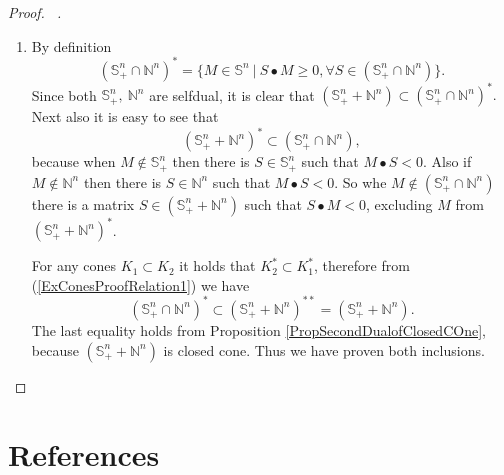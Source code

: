 \documentclass[12pt]{book}
\theoremstyle{definition}
\begin{document}
\begin{appendix}
\begin{proof}[Proof. \ ]
\begin{enumerate}
\item By definition 
$$(\mathbb{S}^n_+\cap \mathbb{N}^n)^* = \{ M\in\mathbb{S}^n \ \vert \ S\bullet M\geq 0, \forall S\in (\mathbb{S}^n_+\cap \mathbb{N}^n)\}. $$
Since both $\mathbb{S}^n_+,\ \mathbb{N}^n$ are selfdual, it is clear that $(\mathbb{S}^n_+ +\mathbb{N}^n) \subset (\mathbb{S}^n_+\cap \mathbb{N}^n)^*.$ Next also it is easy to see that 
\begin{equation}
\label{ExConesProofRelation1}
(\mathbb{S}^n_+ +\mathbb{N}^n)^* \subset (\mathbb{S}^n_+\cap \mathbb{N}^n),
\end{equation}
because 
when $M\notin \mathbb{S}^n_+$  then there is $S\in\mathbb{S}^n_+$ such that $M\bullet S < 0$. Also if $M\notin \mathbb{N}^n$ then there is $S\in\mathbb{N}^n$ such that $M\bullet S < 0$. So whe $M\notin (\mathbb{S}^n_+\cap \mathbb{N}^n)$ there is a matrix $S\in (\mathbb{S}^n_+ + \mathbb{N}^n)$ such that $S\bullet M <0$, excluding $M$ from $(\mathbb{S}^n_+ +\mathbb{N}^n)^*$.



For any cones $K_1\subset K_2$ it holds that $K_2^*\subset K_1^*$, therefore from (\ref{ExConesProofRelation1}) we have $$(\mathbb{S}^n_+ \cap \mathbb{N}^n)^* \subset (\mathbb{S}^n_+ + \mathbb{N}^n)^{**} = (\mathbb{S}^n_+ + \mathbb{N}^n).$$
The last equality holds from Proposition \ref{PropSecondDualofClosedCOne}, because $(\mathbb{S}^n_+ + \mathbb{N}^n)$ is closed cone. Thus we have proven both inclusions.
\end{enumerate}
\end{proof}
\end{appendix}

\chapter*{References}
\end{document}
